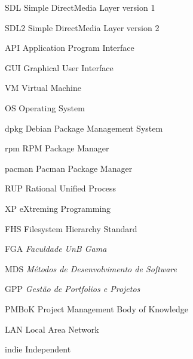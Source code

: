 \begin{siglas}
  \item[SDL] Simple DirectMedia Layer version 1
  \item[SDL2] Simple DirectMedia Layer version 2
  \item[API] Application Program Interface
  \item[GUI] Graphical User Interface
  \item[VM] Virtual Machine
  \item[OS] Operating System
  \item[dpkg] Debian Package Management System
  \item[rpm] RPM Package Manager
  \item[pacman] Pacman Package Manager
  \item[RUP] Rational Unified Process
  \item[XP] eXtreming Programming
  \item[FHS] Filesystem Hierarchy Standard
  \item[FGA] \textit{Faculdade UnB Gama}
  \item[MDS] \textit{M\'etodos de Desenvolvimento de Software}
  \item[GPP] \textit{Gest\~ao de Portfolios e Projetos}
  \item[PMBoK] Project Management Body of Knowledge
  \item[LAN] Local Area Network
  \item[indie] Independent
\end{siglas}

